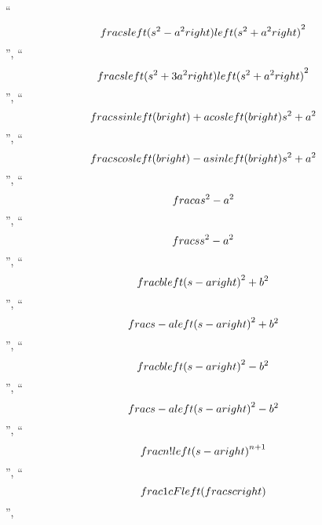 \documentclass[
  letterpaper,
  DIV=11,
  numbers=noendperiod]{scrartcl}
\begin{document}
``\[\\frac{{s\\left( {{s^2} - {a^2}} \\right)}}{{{{\\left( {{s^2} + {a^2}} \\right)}^2}}}\]'',
``\[\\frac{{s\\left( {{s^2} + 3{a^2}} \\right)}}{{{{\\left( {{s^2} + {a^2}} \\right)}^2}}}\]'',
``\[\\frac{{s\\sin \\left( b \\right) + a\\cos \\left( b \\right)}}{{{s^2} + {a^2}}}\]'',
``\[\\frac{{s\\cos \\left( b \\right) - a\\sin \\left( b \\right)}}{{{s^2} + {a^2}}}\]'',
``\[\\frac{a}{{{s^2} - {a^2}}}\]'', ``\[\\frac{s}{{{s^2} - {a^2}}}\]'',
``\[\\frac{b}{{{{\\left( {s - a} \\right)}^2} + {b^2}}}\]'',
``\[\\frac{{s - a}}{{{{\\left( {s - a} \\right)}^2} + {b^2}}}\]'',
``\[\\frac{b}{{{{\\left( {s - a} \\right)}^2} - {b^2}}}\]'',
``\[\\frac{{s - a}}{{{{\\left( {s - a} \\right)}^2} - {b^2}}}\]'',
``\[\\frac{{n!}}{{{{\\left( {s - a} \\right)}^{n + 1}}}}\]'',
``\[\\frac{1}{c}F\\left( {\\frac{s}{c}} \\right)\]'',
\end{document}

